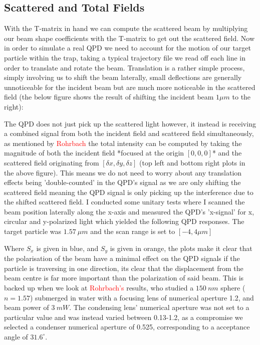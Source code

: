 \documentclass[a4paper,oneside,11pt]{book}
\begin{document}
\subsection{Scattered and Total Fields}
With the T-matrix in hand we can compute the scattered beam by multiplying our beam shape coefficients with the T-matrix to get out the scattered field. Now in order to simulate a real QPD we need to account for the motion of our target particle within the trap, taking a typical trajectory file we read off each line in order to translate and rotate the beam. Translation is a rather simple process, simply involving us to shift the beam laterally, small deflections are generally unnoticeable for the incident beam but are much more noticeable in the scattered field (the below figure shows the result of shifting the incident beam $1\mu m$ to the right):

The QPD does not just pick up the scattered light however, it instead is receiving a combined signal from both the incident field and scattered field simultaneously, as mentioned by \textcolor{red}{Rohrbach} the total intensity can be computed by taking the magnitude of both the incident field *focused at the origin $[0,0,0]$* and the scattered field originating from $[\delta x, \delta y, \delta z]$ (top left and bottom right plots in the above figure). This means we do not need to worry about any translation effects being 'double-counted' in the QPD's signal as we are only shifting the scattered field meaning the QPD signal is only picking up the interference due to the shifted scattered field. I conducted some unitary tests where I scanned the beam position laterally along the x-axis and measured the QPD's 'x-signal' for x, circular and y-polarized light which yielded the following QPD responses. The target particle was $1.57\ \mu m$ and the scan range is set to $[-4, 4 \mu m]$

Where $S_x$ is given in blue, and $S_y$ is given in orange, the plots make it clear that the polarisation of the beam have a minimal effect on the QPD signals if the particle is traversing in one direction, its clear that the displacement from the beam centre is far more important than the polarization of said beam. This is backed up when we look at \textcolor{red}{Rohrbach's} results, who studied a $150\ nm$ sphere ($n=1.57$) submerged in water with a focusing lens of numerical aperture 1.2, and beam power of $3\ mW$. The condensing lens' numerical aperture was not set to a particular value and was instead varied between 0.13-1.2, as a compromise we selected a condenser numerical aperture of 0.525, corresponding to a acceptance angle of $31.6^\circ$. 
\end{document}
